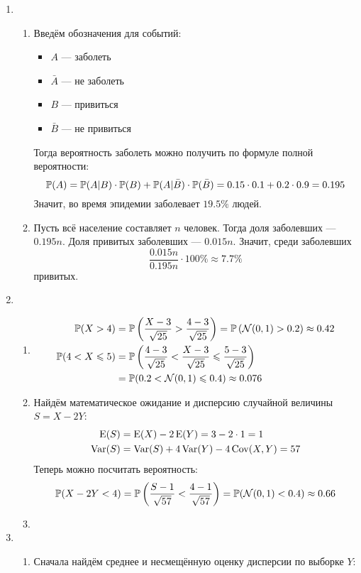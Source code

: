 \begin{enumerate}
\item
\begin{enumerate}
\item Введём обозначения для событий:
\begin{itemize}
  \item $A$ — заболеть
  \item $\bar A$ — не заболеть
  \item $B$ — привиться
  \item $\bar B$ — не привиться
\end{itemize}

Тогда вероятность заболеть можно получить по формуле полной вероятности:
\[
\P(A) = \P(A | B) \cdot \P(B)  + \P(A | \bar B) \cdot \P(\bar B) = 0.15 \cdot 0.1 + 0.2 \cdot 0.9 = 0.195
\]
Значит, во время эпидемии заболевает $19.5\%$ людей.
\item Пусть всё население составляет $n$ человек.
Тогда доля заболевших — $0.195 n$.
Доля привитых заболевших — $0.015 n$.
Значит, среди заболевших
\[
\frac{0.015 n}{0.195 n} \cdot 100 \% \approx 7.7 \%
\]
привитых.
\end{enumerate}
\item
\begin{enumerate}
\item
\begin{align*}
\P(X > 4) &= \P\left(\frac{X - 3}{\sqrt{25}} > \frac{4 - 3}{\sqrt{25}} \right) = \P\left(\cN(0,1) > 0.2\right) \approx 0.42 \\
\P(4 < X \leq 5) &= \P \left(\frac{4 - 3}{\sqrt{25}} < \frac{X - 3}{\sqrt{25}} \leq \frac{5 - 3}{\sqrt{25}} \right)  \\
&= \P(0.2 < \cN(0,1) \leq 0.4) \approx 0.076
\end{align*}
\item Найдём математическое ожидание и дисперсию случайной величины $S = X - 2Y$:
\begin{align*}
\E(S) &= \E(X) - 2\E(Y) = 3 - 2 \cdot 1 = 1 \\
\Var(S) &= \Var(S)  + 4 \Var(Y) - 4 \Cov(X, Y) = 57
\end{align*}
Теперь можно посчитать вероятность:
\[
\P(X - 2Y < 4) = \P \left(\frac{S - 1}{\sqrt{57}} < \frac{4 - 1}{\sqrt{57}} \right) = \P(\cN(0, 1) < 0.4) \approx 0.66
\]
\item
\end{enumerate}
\item
\begin{enumerate}
\item Сначала найдём среднее и несмещённую оценку дисперсии по выборке $Y$:

\end{enumerate}
\end{enumerate}
